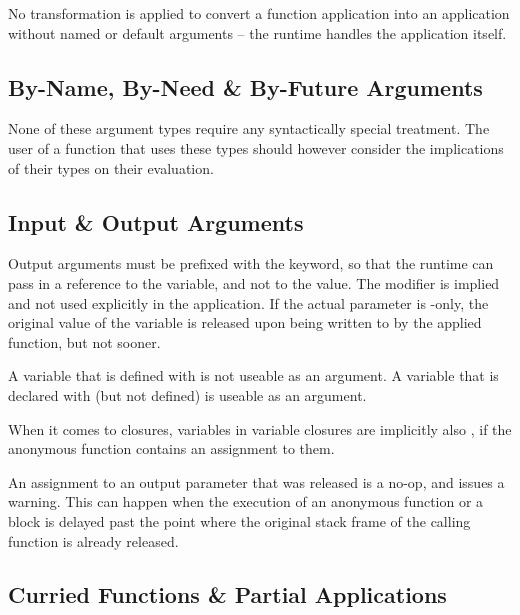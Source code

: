 No transformation is applied to convert a function application into an application without named or default arguments -- the runtime handles the application itself. 






\subsection{By-Name, By-Need \& By-Future Arguments}
\label{sec:by-name-arguments}
\label{sec:by-need-arguments}
\label{sec:by-future-arguments}

None of these argument types require any syntactically special treatment. The user of a function that uses these types should however consider the implications of their types on their evaluation. 






\subsection{Input \& Output Arguments}
\label{sec:io-arguments}

Output arguments must be prefixed with the  keyword, so that the runtime can pass in a reference to the variable, and not to the value. The  modifier is implied and not used explicitly in the application. If the actual parameter is -only, the original value of the variable is released upon being written to by the applied function, but not sooner. 

A variable that is defined with  is not useable as an  argument. A variable that is declared with  (but not defined) is useable as an  argument. 

When it comes to closures, variables in variable closures are implicitly also , if the anonymous function contains an assignment to them. 

An assignment to an output parameter that was released is a no-op, and issues a warning. This can happen when the execution of an anonymous function or a block is delayed past the point where the original stack frame of the calling function is already released. 






\subsection{Curried Functions \& Partial Applications}
\label{sec:curried-functions}
\label{sec:partial-applications}

